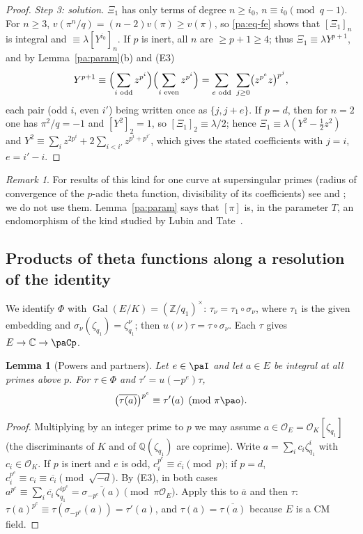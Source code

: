 \documentclass[10pt]{amsart}
\newtheorem{lemma}[theorem]{Lemma}
\theoremstyle{definition}
\theoremstyle{remark}
\newtheorem{remark}[theorem]{Remark}
\newcommand{\C}{\mathbb C}
\newcommand{\Z}{\mathbb Z}
\newcommand{\Q}{\mathbb Q}
\providecommand{\auO}{\mathcal O}
\providecommand{\auPl}{\Phi}
\providecommand{\aubar}[1]{\overline{#1}}
\begin{document}
\begin{proof}
\emph{Step 3: solution.} $\Xi_1$ has only terms of degree $n\ge i_0$, $n\equiv i_0\pmod{q-1}$. For
$n\ge3$, $v(\pi^n/q)=(n-2)v(\pi)\ge v(\pi)$, so \eqref{pa:eq-fe} shows that $[\Xi_1]_n$ is integral
and $\equiv\lambda[Y^{i_0}]_n$. If $p$ is inert, all $n$ are $\ge p+1\ge4$; thus
$\Xi_1\equiv\lambda Y^{p+1}$, and by Lemma~\ref{pa:param}(b) and (E3)
\[
Y^{p+1}\equiv\Bigl(\sum_{i\text{ odd}}z^{p^i}\Bigr)\Bigl(\sum_{i\text{ even}}z^{p^i}\Bigr)
=\sum_{e\text{ odd}}\ \sum_{j\ge0}\bigl(z^{p^e}z\bigr)^{p^j},
\]
each pair (odd $i$, even $i'$) being written once as $\{j,j+e\}$. If $p=d$, then for $n=2$ one has
$\pi^2/q=-1$ and $[Y^2]_2=1$, so $[\Xi_1]_2\equiv\lambda/2$; hence
$\Xi_1\equiv\lambda(Y^2-\tfrac12z^2)$ and
$Y^2\equiv\sum_iz^{2p^i}+2\sum_{i<i'}z^{p^i+p^{i'}}$, which gives the stated coefficients with
$j=i$, $e=i'-i$.
\end{proof}

\begin{remark}
For results of this kind for one curve at supersingular primes (radius of convergence of the
$p$-adic theta function, divisibility of its coefficients) see \cite{BannaiKobayashi} and
\cite{KatzDivisibilities}; we do not use them. Lemma~\ref{pa:param} says that $[\pi]$ is, in the
parameter $T$, an endomorphism of the kind studied by Lubin and Tate~\cite{LubinTate}.
\end{remark}

\subsection{Products of theta functions along a resolution of the identity}\label{pa:ss-prod}
We identify $\auPl$ with $\operatorname{Gal}(E/K)=(\Z/q_1)^\times$: $\tau_\nu=\tau_1\circ\sigma_\nu$,
where $\tau_1$ is the given embedding and $\sigma_\nu(\zeta_{q_1})=\zeta_{q_1}^{\nu}$; then
$u(\nu)\tau=\tau\circ\sigma_\nu$. Each $\tau$ gives $E\to\C\to\paCp$.

\begin{lemma}[Powers and partners]\label{pa:partner}
Let $e\in\paI$ and let $a\in E$ be integral at all primes above $p$. For $\tau\in\auPl$ and
$\tau'=u(-p^e)\tau$,
\[
\bigl(\aubar{\tau(a)}\bigr)^{p^e}\equiv\tau'(a)\pmod{\pi\pao}.
\]
\end{lemma}
\begin{proof}
Multiplying by an integer prime to $p$ we may assume $a\in\auO_E=\auO_K[\zeta_{q_1}]$ (the
discriminants of $K$ and of $\Q(\zeta_{q_1})$ are coprime). Write $a=\sum_ic_i\zeta_{q_1}^i$ with
$c_i\in\auO_K$. If $p$ is inert and $e$ is odd, $c_i^{p^e}\equiv\aubar{c_i}\pmod p$; if $p=d$,
$c_i^{p^e}\equiv c_i\equiv\aubar{c_i}\pmod{\sqrt{-d}}$. By (E3), in both cases
$a^{p^e}\equiv\sum_i\aubar{c_i}\,\zeta_{q_1}^{ip^e}=\aubar{\sigma_{-p^e}(a)}\pmod{\pi\auO_E}$.
Apply this to $\aubar a$ and then $\tau$: $\tau(\aubar a)^{p^e}\equiv\tau(\sigma_{-p^e}(a))=
\tau'(a)$, and $\tau(\aubar a)=\aubar{\tau(a)}$ because $E$ is a CM field.
\end{proof}
\end{document}
